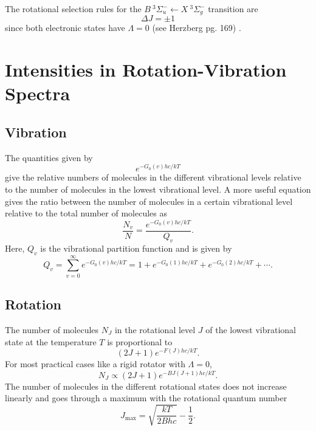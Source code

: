 \documentclass[11pt, twoside, fleqn]{report}
\newcommand{\up}{\text}
\newcommand{\eul}{e}
\begin{document}
The rotational selection rules for the $B~^3\Sigma_u^-\!\leftarrow\!X~^3\Sigma_g^-$ transition are
\begin{equation}
    \Delta{}J = \pm 1
\end{equation}
since both electronic states have $\Lambda = 0$ (see Herzberg pg. 169) \cite{herzberg:spectra}.

\chapter{Intensities in Rotation-Vibration Spectra}
\label{c:intensities_in_rotation-vibration_spectra}

\section{Vibration}
\label{s:vibration}

The quantities given by
\begin{equation*}
    \eul^{-G_0(v)hc/kT}
\end{equation*}
give the relative numbers of molecules in the different vibrational levels relative to the number of molecules in the lowest vibrational level. A more useful equation gives the ratio between the number of molecules in a certain vibrational level relative to the total number of molecules as
\begin{equation*}
    \frac{N_v}{N} = \frac{\eul^{-G_0(v)hc/kT}}{Q_v}.
\end{equation*}
Here, $Q_v$ is the vibrational partition function and is given by
\begin{equation*}
    Q_v = \sum_{v=0}^{\infty}\eul^{-G_0(v)hc/kT} = 1 + \eul^{-G_0(1)hc/kT} + \eul^{-G_0(2)hc/kT} + \dotsb.
\end{equation*}

\section{Rotation}
\label{s:rotation}

The number of molecules $N_J$ in the rotational level $J$ of the lowest vibrational state at the temperature $T$ is proportional to
\begin{equation*}
    (2J + 1)\eul^{-F(J)hc/kT}.
\end{equation*}
For most practical cases like a rigid rotator with $\Lambda = 0$,
\begin{equation*}
    N_J \propto (2J + 1)\eul^{-BJ(J + 1)hc/kT}.
\end{equation*}
The number of molecules in the different rotational states does not increase linearly and goes through a maximum with the rotational quantum number
\begin{equation*}
    J_\up{max} = \sqrt{\frac{kT}{2Bhc}} - \frac{1}{2}.
\end{equation*}
\end{document}
